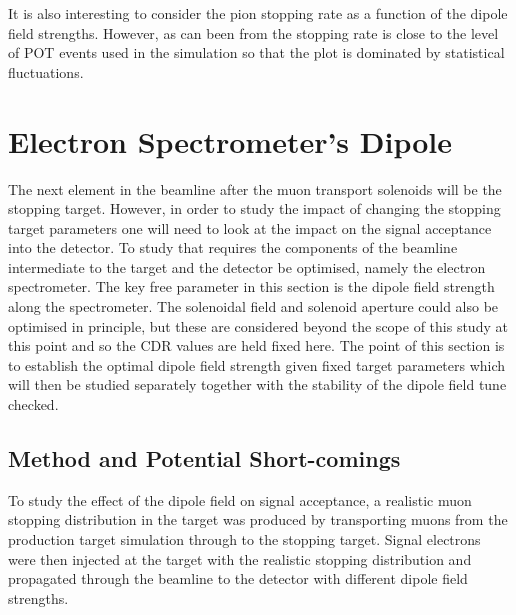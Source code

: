It is also interesting to consider the pion stopping rate as a function of the dipole field strengths.
However, as can been from  the stopping rate is close to the level of POT events used in the simulation so that the plot is dominated by statistical fluctuations.

\section{Electron Spectrometer's Dipole}
The next element in the beamline after the muon transport solenoids will be the stopping target.
However, in order to study the impact of changing the stopping target parameters one will need to look at the impact on the signal acceptance into the detector.
To study that requires the components of the beamline intermediate to the target and the detector be optimised, namely the electron spectrometer.
The key free parameter in this section is the dipole field strength along the spectrometer.
The solenoidal field and solenoid aperture could also be optimised in principle, but these are considered beyond the scope of this study at this point and so the CDR values are held fixed here.
The point of this section is to establish the optimal dipole field strength given fixed target parameters which will then be studied separately together with the stability of the dipole field tune checked.

\subsection{Method and Potential Short-comings}
To study the effect of the dipole field on signal acceptance, a realistic muon stopping distribution in the target was produced by transporting muons from the production target simulation through to the stopping target.
Signal electrons were then injected at the target with the realistic stopping distribution and propagated through the beamline to the detector with different dipole field strengths.

